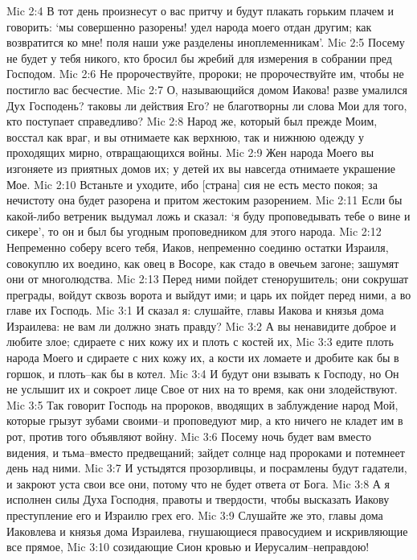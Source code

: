 Mic 2:4  В тот день произнесут о вас притчу и будут плакать горьким плачем и говорить: `мы совершенно разорены! удел народа моего отдан другим; как возвратится ко мне! поля наши уже разделены иноплеменникам'.
Mic 2:5  Посему не будет у тебя никого, кто бросил бы жребий для измерения в собрании пред Господом.
Mic 2:6  Не пророчествуйте, пророки; не пророчествуйте им, чтобы не постигло вас бесчестие.
Mic 2:7  О, называющийся домом Иакова! разве умалился Дух Господень? таковы ли действия Его? не благотворны ли слова Мои для того, кто поступает справедливо?
Mic 2:8  Народ же, который был прежде Моим, восстал как враг, и вы отнимаете как верхнюю, так и нижнюю одежду у проходящих мирно, отвращающихся войны.
Mic 2:9  Жен народа Моего вы изгоняете из приятных домов их; у детей их вы навсегда отнимаете украшение Мое.
Mic 2:10  Встаньте и уходите, ибо [страна] сия не есть место покоя; за нечистоту она будет разорена и притом жестоким разорением.
Mic 2:11  Если бы какой-либо ветреник выдумал ложь и сказал: `я буду проповедывать тебе о вине и сикере', то он и был бы угодным проповедником для этого народа.
Mic 2:12  Непременно соберу всего тебя, Иаков, непременно соединю остатки Израиля, совокуплю их воедино, как овец в Восоре, как стадо в овечьем загоне; зашумят они от многолюдства.
Mic 2:13  Перед ними пойдет стенорушитель; они сокрушат преграды, войдут сквозь ворота и выйдут ими; и царь их пойдет перед ними, а во главе их Господь.
Mic 3:1  И сказал я: слушайте, главы Иакова и князья дома Израилева: не вам ли должно знать правду?
Mic 3:2  А вы ненавидите доброе и любите злое; сдираете с них кожу их и плоть с костей их,
Mic 3:3  едите плоть народа Моего и сдираете с них кожу их, а кости их ломаете и дробите как бы в горшок, и плоть--как бы в котел.
Mic 3:4  И будут они взывать к Господу, но Он не услышит их и сокроет лице Свое от них на то время, как они злодействуют.
Mic 3:5  Так говорит Господь на пророков, вводящих в заблуждение народ Мой, которые грызут зубами своими--и проповедуют мир, а кто ничего не кладет им в рот, против того объявляют войну.
Mic 3:6  Посему ночь будет вам вместо видения, и тьма--вместо предвещаний; зайдет солнце над пророками и потемнеет день над ними.
Mic 3:7  И устыдятся прозорливцы, и посрамлены будут гадатели, и закроют уста свои все они, потому что не будет ответа от Бога.
Mic 3:8  А я исполнен силы Духа Господня, правоты и твердости, чтобы высказать Иакову преступление его и Израилю грех его.
Mic 3:9  Слушайте же это, главы дома Иаковлева и князья дома Израилева, гнушающиеся правосудием и искривляющие все прямое,
Mic 3:10  созидающие Сион кровью и Иерусалим--неправдою!
